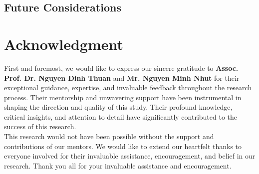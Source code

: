 \documentclass{ieeeojies}
\begin{document}
\subsection{Future Considerations}

\section*{Acknowledgment}
First and foremost, we would like to express our sincere gratitude to \textbf{Assoc. Prof. Dr. Nguyen Dinh Thuan} and \textbf{Mr. Nguyen Minh Nhut} for their exceptional guidance, expertise, and invaluable feedback throughout the research process. Their mentorship and unwavering support have been instrumental in shaping the direction and quality of this study. Their profound knowledge, critical insights, and attention to detail have significantly contributed to the success of this research.
\\This research would not have been possible without the support and contributions of our mentors. We would like to extend our heartfelt thanks to everyone involved for their invaluable assistance, encouragement, and belief in our research. Thank you all for your invaluable assistance and encouragement.
\end{document}

